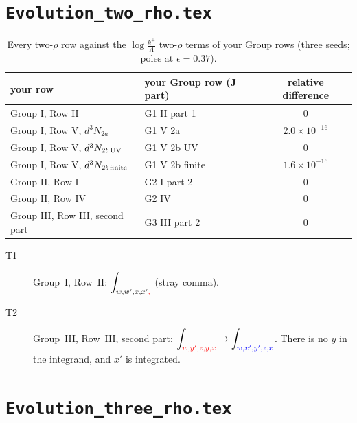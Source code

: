 \documentclass[10pt]{article}
\numberwithin{equation}{section}
\newcommand{\new}[1]{{\color{blue}#1}}
\newcommand{\old}[1]{{\color{red}#1}}
\begin{document}
\section{\texttt{Evolution\_two\_rho.tex}}
\begin{table}[H]\centering\small
\begin{tabular}{llc}
\toprule
your row & your Group row (J part) & relative difference\\
\midrule
Group I, Row II & G1 II part 1 & $0$\\
Group I, Row V, $d^3N_{2a}$ & G1 V 2a & $2.0\times10^{-16}$\\
Group I, Row V, $d^3N_{2b\,\rm UV}$ & G1 V 2b UV & $0$\\
Group I, Row V, $d^3N_{2b\,\rm finite}$ & G1 V 2b finite & $1.6\times10^{-16}$\\
Group II, Row I & G2 I part 2 & $0$\\
Group II, Row IV & G2 IV & $0$\\
Group III, Row III, second part & G3 III part 2 & $0$\\
\bottomrule
\end{tabular}
\caption{Every two-$\rho$ row against the $\log\frac{k^+}{\Lambda}$ two-$\rho$ terms of your Group rows (three seeds; poles at $\epsilon=0.37$).}\label{tab:two}
\end{table}
\begin{description}
\item[T1] Group~I, Row~II: $\displaystyle\int_{w,w',x,x'\old{,}}$ (stray comma).
\item[T2] Group~III, Row~III, second part: $\displaystyle\int_{\old{w,y',z,y,x}}\to\int_{\new{w,x',y',z,x}}$. There is no $y$ in the integrand, and $x'$ is integrated.
\end{description}

\section{\texttt{Evolution\_three\_rho.tex}}
\end{document}
